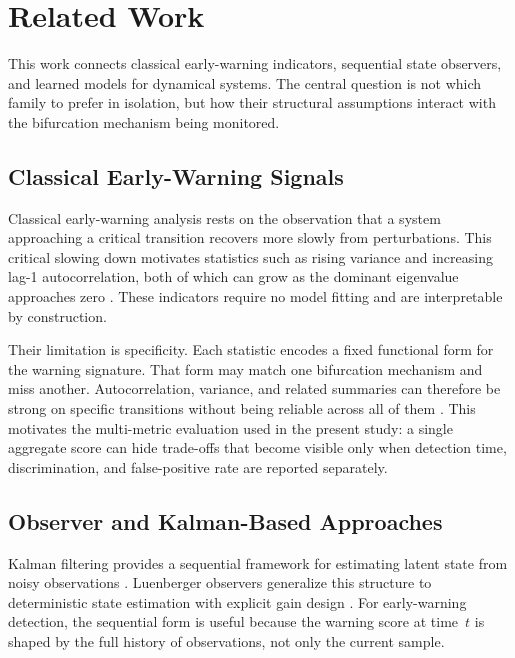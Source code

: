 \section{Related Work}
\label{sec:related}

This work connects classical early-warning indicators, sequential state
observers, and learned models for dynamical systems. The central question is
not which family to prefer in isolation, but how their structural assumptions
interact with the bifurcation mechanism being monitored.

\subsection{Classical Early-Warning Signals}
\label{sec:related:classical}

Classical early-warning analysis rests on the observation that a system
approaching a critical transition recovers more slowly from perturbations.
This critical slowing down motivates statistics such as rising variance and
increasing lag-1 autocorrelation, both of which can grow as the dominant
eigenvalue approaches zero
\citep{scheffer2009early,dakos2008slowing,carpenter2006rising}. These
indicators require no model fitting and are interpretable by construction.

Their limitation is specificity. Each statistic encodes a fixed functional
form for the warning signature. That form may match one bifurcation mechanism
and miss another. Autocorrelation, variance, and related summaries can
therefore be strong on specific transitions without being reliable across all
of them \citep{boettiger2012early,lenton2011early}. This motivates the
multi-metric evaluation used in the present study: a single aggregate score
can hide trade-offs that become visible only when detection time,
discrimination, and false-positive rate are reported separately.

\subsection{Observer and Kalman-Based Approaches}
\label{sec:related:observer}

Kalman filtering provides a sequential framework for estimating latent state
from noisy observations \citep{kalman1960new}. Luenberger observers
generalize this structure to deterministic state estimation with explicit gain
design \citep{luenberger1971introduction}. For early-warning detection, the
sequential form is useful because the warning score at time~\(t\) is shaped
by the full history of observations, not only the current sample.

